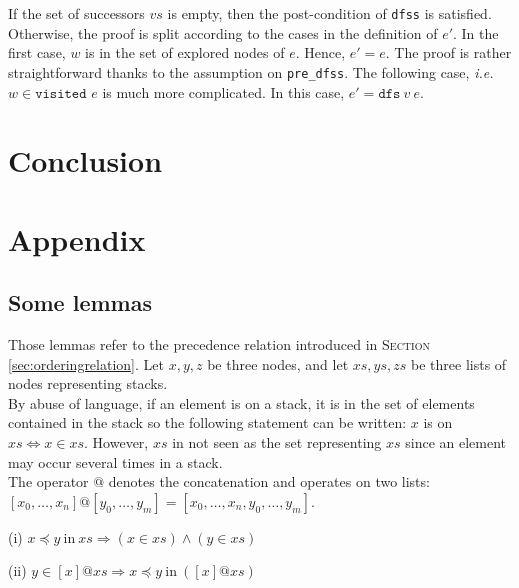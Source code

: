 \documentclass[a4 paper, 12pt]{article}
\begin{document}
{If the set of successors $vs$ is empty, then the post-condition of \texttt{dfss} is satisfied.
Otherwise, the proof is split according to the cases in the definition of $e'$. In the first case, $w$ is in the set of explored nodes of $e$. Hence, $e' = e$. The proof is rather straightforward thanks to the assumption on \texttt{pre\_dfss}. The following case, \textit{i.e.} $w \in \texttt{visited }e$ is much more complicated. In this case, $e' = \texttt{dfs}~v~e$.

\section{Conclusion}


\pagebreak

\section{Appendix}\label{appendix}
\subsection{Some lemmas}
Those lemmas refer to the precedence relation introduced in \textsc{Section} \ref{sec:orderingrelation}.
\BlankLine
Let $x, y, z$ be three nodes, and let $xs, ys, zs$ be three lists of nodes representing stacks.\\
By abuse of language, if an element is on a stack, it is in the set of elements contained in the stack so the following statement can be written: $x$ is on $xs \Longleftrightarrow x \in xs$. However, $xs$ in not seen as the set representing $xs$ since an element may occur several times in a stack.\\
The operator $@$ denotes the concatenation and operates on two lists: $[x_0, \dots, x_n] @ [y_0, \dots, y_m] = [x_0, \dots, x_n, y_0, \dots, y_m]$.\\

\begin{flushleft}
    (i)
$x \preceq y~\text{in}~xs \Longrightarrow (x \in xs)\wedge(y \in xs)$
\end{flushleft}
\begin{flushleft}
    (ii)
$y \in [x] @ xs \Longrightarrow x \preceq y~\text{in}~([x] @ xs)$
\end{flushleft}

}
\end{document}
